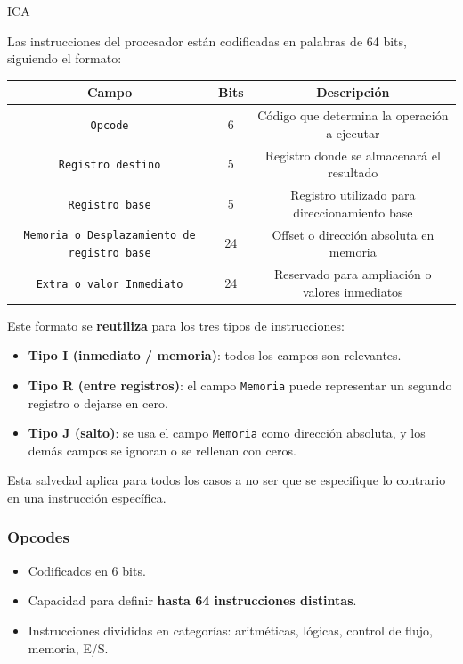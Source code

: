 ICA\documentclass{article}
\begin{document}
Las instrucciones del procesador están codificadas en palabras de 64 bits, siguiendo el formato:

\begin{table}[h!]
  \centering
  \begin{tabular}{|c|c|c|}
    \hline
    \textbf{Campo}                                     & \textbf{Bits} & \textbf{Descripción}                           \\
    \hline
    \texttt{Opcode}                                    & 6             & Código que determina la operación a ejecutar   \\
    \texttt{Registro destino}                          & 5             & Registro donde se almacenará el resultado      \\
    \texttt{Registro base}                             & 5             & Registro utilizado para direccionamiento base  \\
    \texttt{Memoria o Desplazamiento de registro base} & 24            & Offset o dirección absoluta en memoria         \\
    \texttt{Extra o valor Inmediato}                   & 24            & Reservado para ampliación o valores inmediatos \\
    \hline
  \end{tabular}
\end{table}

Este formato se \textbf{reutiliza} para los tres tipos de instrucciones:

\begin{itemize}
  \item \textbf{Tipo I (inmediato / memoria)}: todos los campos son relevantes.
  \item \textbf{Tipo R (entre registros)}: el campo \texttt{Memoria} puede representar un segundo registro o dejarse en cero.
  \item \textbf{Tipo J (salto)}: se usa el campo \texttt{Memoria} como dirección absoluta, y los demás campos se ignoran o se rellenan con ceros.
\end{itemize}

Esta salvedad aplica para todos los casos a no ser que se especifique lo contrario en una instrucción específica.

\subsubsection{Opcodes}

\begin{itemize}
  \item Codificados en 6 bits.
  \item Capacidad para definir \textbf{hasta 64 instrucciones distintas}.
  \item Instrucciones divididas en categorías: aritméticas, lógicas, control de flujo, memoria, E/S.
\end{itemize}
\end{document}
